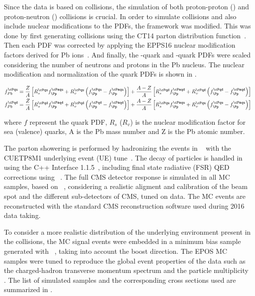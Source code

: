 Since the data is based on \pPb collisions, the simulation of both proton-proton (\pp) and proton-neutron (\pn) collisions is crucial. In order to simulate \pPb collisions and also include nuclear modifications to the PDFs, the \POWHEG framework was modified. This was done by first generating \pp collisions using the CT14 parton distribution function~\cite{CT14}. Then each PDF was corrected by applying the EPPS16 nuclear modification factors derived for Pb ions~\cite{EPPS16}. And finally, the \cPqu-quark and \cPqd-quark PDFs were scaled considering the number of neutrons and protons in the Pb nucleus. The nuclear modification and normalization of the quark PDFs is shown in .

\begin{equation}
\begin{aligned}
f^{\cPqu}_{Pb} &= \frac{Z}{A}\left[R^{\cPqu}_{s}f^{\cPaqu}_{\Pp} + R^{\cPqu}_{v}\left(f^{\cPqu}_{\Pp}-f^{\cPaqu}_{\Pp}\right)\right] + \frac{A-Z}{A}\left[R^{\cPqd}_{s}f^{\cPaqd}_{\Pp} + R^{\cPqd}_{v}\left(f^{\cPqd}_{\Pp}-f^{\cPaqd}_{\Pp}\right)\right] \\
f^{\cPqd}_{Pb} &= \frac{Z}{A}\left[R^{\cPqd}_{s}f^{\cPaqd}_{\Pp} + R^{\cPqd}_{v}\left(f^{\cPqd}_{\Pp}-f^{\cPaqd}_{\Pp}\right)\right] + \frac{A-Z}{A}\left[R^{\cPqu}_{s}f^{\cPaqu}_{\Pp} + R^{\cPqu}_{v}\left(f^{\cPqu}_{\Pp}-f^{\cPaqu}_{\Pp}\right)\right]
\end{aligned}
\label{eq:PbScaling}
\end{equation}

where $f$ represent the quark PDF, $R_{s}$ ($R_{v}$) is the nuclear modification factor for sea (valence) quarks, A is the Pb mass number and Z is the Pb atomic number.

The parton showering is performed by hadronizing the \POWHEG events in ~\cite{PYTHIA8} with the CUETP8M1 underlying event (UE) tune~\cite{PYTHIA_TUNE,UE_pp}. The decay of \PGt particles is handled in \PYTHIA using the \TAUOLA C++ Interface 1.1.5~\cite{TAUOLA}, including final state radiative (FSR) QED corrections using~ \cite{PHOTOS}. The full CMS detector response is simulated in all MC samples, based on \GEANTfour~\cite{GEANT4}, considering a realistic aligment and calibration of the beam spot and the different sub-detectors of CMS, tuned on data. The MC events are reconstructed with the standard CMS \pp reconstruction software used during 2016 data taking.

To consider a more realistic distribution of the underlying environment present in the \pPb collisions, the MC signal events were embedded in a minimum bias sample generated with \EPOS~\cite{EPOS}, taking into account the \pPb boost direction. The EPOS MC samples were tuned to reproduce the global event properties of the \pPb data such as the charged-hadron transverse momentum spectrum and the particle multiplicity \cite{dNdEta_pPb}. The list of simulated samples and the corresponding cross sections used are summarized in .

